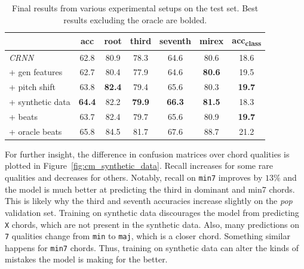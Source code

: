 \begin{table}[h]
    \centering
    \begin{tabular}{lcccccc}
        \toprule
         & acc & root & third & seventh & mirex & acc\textsubscript{class} \\
        \midrule
        \emph{CRNN}                & 62.8  & 80.9  & 78.3  & 64.6  & 80.6  & 18.6 \\
        + gen features             & 62.7  & 80.4  & 77.9  & 64.6  & \textbf{80.6}  & 19.5 \\
        + pitch shift              & 63.8  & \textbf{82.4}  & 79.4  & 65.6  & 80.3  & \textbf{19.7} \\
        + synthetic data           & \textbf{64.4}  & 82.2  & \textbf{79.9}  & \textbf{66.3}  & \textbf{81.5}  & 18.3 \\
        + beats                    & 63.7  & 82.4  & 79.7  & 65.6  & 80.9  & \textbf{19.7} \\
        \midrule
        + oracle beats             & 65.8  & 84.5  & 81.7  & 67.6  & 88.7  & 21.2 \\
        \bottomrule
    \end{tabular}
    \caption{Final results from various experimental setups on the test set. Best results excluding the oracle are bolded.
    }\label{tab:test_set}
\end{table}

For further insight, the difference in confusion matrices over chord qualities is plotted in Figure~\ref{fig:cm_synthetic_data}. Recall increases for some rare qualities and decreases for others. Notably, recall on \texttt{min7} improves by $13\%$ and the model is much better at predicting the third in dominant and min7 chords. This is likely why the third and seventh accuracies increase slightly on the \emph{pop} validation set. Training on synthetic data discourages the model from predicting \texttt{X} chords, which are not present in the synthetic data. Also, many predictions on \texttt{7} qualities change from \texttt{min} to \texttt{maj}, which is a closer chord. Something similar happens for \texttt{min7} chords. Thus, training on synthetic data can alter the kinds of mistakes the model is making for the better. 


